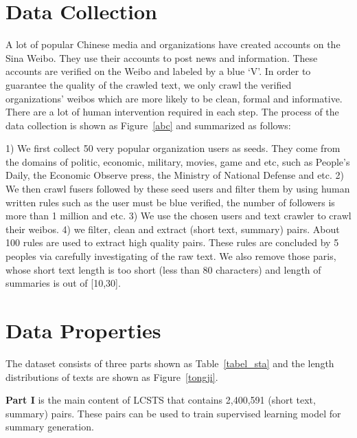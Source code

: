 \documentclass[11pt,a4paper]{article}
\begin{document}
\section{Data Collection}
\vspace{-2pt}

A lot of popular Chinese media and organizations have created accounts on the Sina Weibo. They use their accounts to post news and information. These accounts are verified on the Weibo and labeled by a blue `V'. In order to guarantee the quality of the crawled text, we only crawl the verified organizations' weibos which are more likely to be clean, formal and informative.  There are a lot of human intervention required in each step. The process of the data collection is shown as Figure~\ref{abc} and summarized as follows:

1) We first collect 50 very popular organization users as seeds. They come from the domains of politic, economic, military, movies, game and etc, such as People's Daily, the Economic Observe press, the Ministry of National Defense and etc. 2) We then crawl fusers followed by these seed users and filter them by using human written rules such as  the user must be blue verified,  the number of followers is more than 1 million and etc. 3) We use the chosen users and text crawler to crawl their weibos. 4) we filter, clean and extract (short text, summary) pairs.  About 100 rules are used to extract high quality pairs. These rules are concluded by 5 peoples via carefully investigating of the raw text.  We also remove those paris, whose short text length is too short (less than 80 characters) and length of summaries is out of [10,30].

\section{Data Properties}
\vspace{-2pt}

The dataset consists of three parts shown as Table~\ref{tabel_sta} and the length distributions of texts are shown as Figure~\ref{tongji}.

\textbf{Part I} is the main content of LCSTS that contains 2,400,591 (short text, summary) pairs. These pairs can be used to train supervised learning model for summary generation.
\end{document}

